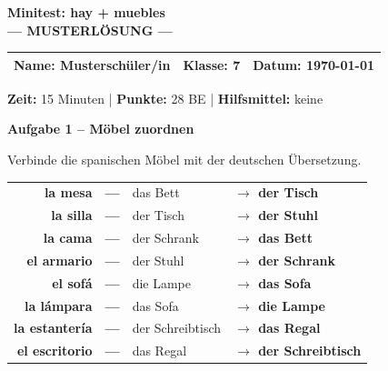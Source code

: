 \documentclass[11pt, a4paper]{article}
\newcommand{\fachfarbe}{spanisch}
\newcommand{\thema}{Minitest: hay + muebles}
\newcommand{\klasse}{7}
\newcommand{\maxpunkte}{28}
\newcommand{\zeit}{15 Minuten}
\newcommand{\datum}{\today}
\newcommand{\punktebox}[1]{\hfill\fbox{\small \_/#1}}
\newcommand{\lsg}[1]{\textcolor{loesung}{\textbf{#1}}}
\newenvironment{aufgabe}[1]{%
    \needspace{5\baselineskip}%
    \nopagebreak[4]%
    \vspace{10pt}
    \noindent\textbf{\textcolor{\fachfarbe}{Aufgabe #1}}
    \nopagebreak[4]%
    \vspace{5pt}
    \nopagebreak[4]%
    \begin{list}{}{\leftmargin=0pt}
    \item[]
}{%
    \end{list}
}
\newcommand{\es}[1]{\textcolor{\fachfarbe}{\textbf{#1}}}
\begin{document}

\begin{center}
    {\Large\bfseries\textcolor{\fachfarbe}{\thema}}\\[0.3em]
    {\large\textcolor{loesung}{\textbf{--- MUSTERLÖSUNG ---}}}
\end{center}

\vspace{5pt}

\noindent
\begin{tabularx}{\textwidth}{|X|X|X|}
\hline
\textbf{Name:} \lsg{Musterschüler/in} &
\textbf{Klasse:} \klasse &
\textbf{Datum:} \datum \\
\hline
\end{tabularx}

\vspace{10pt}

\begin{infobox}
\textbf{Zeit:} \zeit{} | \textbf{Punkte:} \maxpunkte{} BE | \textbf{Hilfsmittel:} keine
\end{infobox}

\vspace{15pt}


\begin{aufgabe}{1 -- Möbel zuordnen}
Verbinde die spanischen Möbel mit der deutschen Übersetzung. \punktebox{8}
\end{aufgabe}

\begin{center}
\begin{tabular}{rclp{4cm}}
\es{la mesa} & \lsg{---} & das Bett & \lsg{$\rightarrow$ der Tisch} \\[0.8em]
\es{la silla} & \lsg{---} & der Tisch & \lsg{$\rightarrow$ der Stuhl} \\[0.8em]
\es{la cama} & \lsg{---} & der Schrank & \lsg{$\rightarrow$ das Bett} \\[0.8em]
\es{el armario} & \lsg{---} & der Stuhl & \lsg{$\rightarrow$ der Schrank} \\[0.8em]
\es{el sofá} & \lsg{---} & die Lampe & \lsg{$\rightarrow$ das Sofa} \\[0.8em]
\es{la lámpara} & \lsg{---} & das Sofa & \lsg{$\rightarrow$ die Lampe} \\[0.8em]
\es{la estantería} & \lsg{---} & der Schreibtisch & \lsg{$\rightarrow$ das Regal} \\[0.8em]
\es{el escritorio} & \lsg{---} & das Regal & \lsg{$\rightarrow$ der Schreibtisch} \\
\end{tabular}
\end{center}
\end{document}
